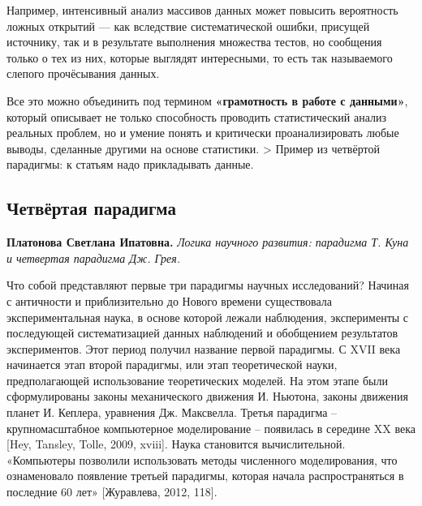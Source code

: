 \documentclass[11pt,a4paper]{article}
\begin{document}
Например, интенсивный анализ массивов данных может повысить вероятность
ложных открытий --- как вследствие систематической ошибки, присущей
источнику, так и в результате выполнения множества тестов, но сообщения
только о тех из них, которые выглядят интересными, то есть так
называемого слепого прочёсывания данных.

Все это можно объединить под термином \textbf{«грамотность в работе с
данными»}, который описывает не только способность проводить
статистический анализ реальных проблем, но и умение понять и критически
проанализировать любые выводы, сделанные другими на основе статистики.
\textgreater{} Пример из четвёртой парадигмы: к статьям надо
прикладывать данные.

    \hypertarget{ux447ux435ux442ux432ux451ux440ux442ux430ux44f-ux43fux430ux440ux430ux434ux438ux433ux43cux430}{%
\subsection{Четвёртая
парадигма}\label{ux447ux435ux442ux432ux451ux440ux442ux430ux44f-ux43fux430ux440ux430ux434ux438ux433ux43cux430}}

\textbf{Платонова Светлана Ипатовна.} \emph{Логика научного развития:
парадигма Т. Куна и четвертая парадигма Дж. Грея.}

Что собой представляют первые три парадигмы научных исследований?
Начиная с античности и приблизительно до Нового времени существовала
экспериментальная наука, в основе которой лежали наблюдения,
эксперименты с последующей систематизацией данных наблюдений и
обобщением результатов экспериментов. Этот период получил название
первой парадигмы. С XVII века начинается этап второй парадигмы, или этап
теоретической науки, предполагающей использование теоретических моделей.
На этом этапе были сформулированы законы механического движения И.
Ньютона, законы движения планет И. Кеплера, уравнения Дж. Максвелла.
Третья парадигма -- крупномасштабное компьютерное моделирование --
появилась в середине XX века {[}Hey, Tansley, Tolle, 2009, xviii{]}.
Наука становится вычислительной. «Компьютеры позволили использовать
методы численного моделирования, что ознаменовало появление третьей
парадигмы, которая начала распространяться в последние 60 лет»
{[}Журавлева, 2012, 118{]}.
\end{document}
